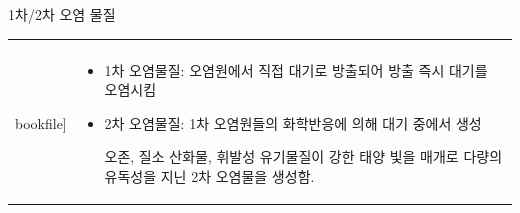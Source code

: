 \begin{frame}[t]{1차/2차 오염 물질}
	\begin{tabular}{ll}
		\begin{minipage}[t]{0.55\textwidth}\scriptsize
			\begin{figure}[t]
				\texttt{[image: \\bookfile]}
			\end{figure}
		\end{minipage}	
		&
		\begin{minipage}[t]{0.4\textwidth} \scriptsize	
			
			\begin{itemize}
				\item 1차 오염물질: 오염원에서 직접 대기로 방출되어 방출 즉시 대기를 오염시킴
				\item 2차 오염물질: 1차 오염원들의 화학반응에 의해 대기 중에서 생성
				
				오존, 질소 산화물, 휘발성 유기물질이 강한 태양 빛을 매개로 다량의 유독성을 지닌 2차 오염물을 생성함. 
			\end{itemize}

		\end{minipage}
	\end{tabular}
\end{frame}





